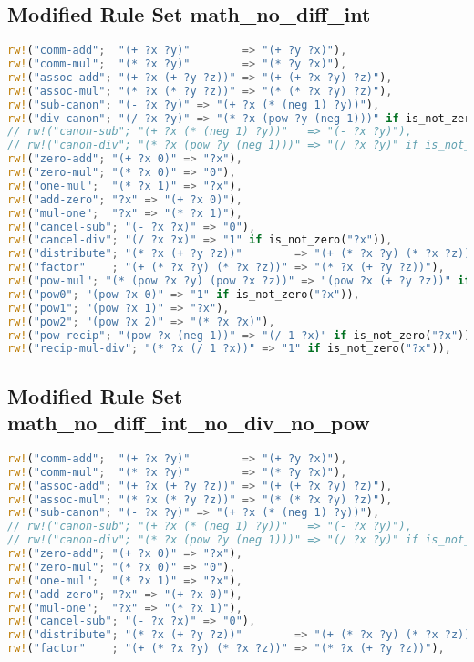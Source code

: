 \newpage
\subsection{Modified Rule Set math\_no\_diff\_int}
\label{app:no_diff_int}
\begin{lstlisting}[language=Rust, caption={Rule set \ref{app:base_rules} without differentiation and integration rules and $-1$ replaced with $\text{neg}(1)$.}, label={lst:no_diff_int}]
rw!("comm-add";  "(+ ?x ?y)"        => "(+ ?y ?x)"),
rw!("comm-mul";  "(* ?x ?y)"        => "(* ?y ?x)"),
rw!("assoc-add"; "(+ ?x (+ ?y ?z))" => "(+ (+ ?x ?y) ?z)"),
rw!("assoc-mul"; "(* ?x (* ?y ?z))" => "(* (* ?x ?y) ?z)"),	
rw!("sub-canon"; "(- ?x ?y)" => "(+ ?x (* (neg 1) ?y))"),
rw!("div-canon"; "(/ ?x ?y)" => "(* ?x (pow ?y (neg 1)))" if is_not_zero("?y")),
// rw!("canon-sub"; "(+ ?x (* (neg 1) ?y))"   => "(- ?x ?y)"),
// rw!("canon-div"; "(* ?x (pow ?y (neg 1)))" => "(/ ?x ?y)" if is_not_zero("?y")),	
rw!("zero-add"; "(+ ?x 0)" => "?x"),
rw!("zero-mul"; "(* ?x 0)" => "0"),
rw!("one-mul";  "(* ?x 1)" => "?x"),	
rw!("add-zero"; "?x" => "(+ ?x 0)"),
rw!("mul-one";  "?x" => "(* ?x 1)"),	
rw!("cancel-sub"; "(- ?x ?x)" => "0"),
rw!("cancel-div"; "(/ ?x ?x)" => "1" if is_not_zero("?x")),	
rw!("distribute"; "(* ?x (+ ?y ?z))"        => "(+ (* ?x ?y) (* ?x ?z))"),
rw!("factor"    ; "(+ (* ?x ?y) (* ?x ?z))" => "(* ?x (+ ?y ?z))"),
rw!("pow-mul"; "(* (pow ?x ?y) (pow ?x ?z))" => "(pow ?x (+ ?y ?z))" if is_not_zero("?x")),
rw!("pow0"; "(pow ?x 0)" => "1" if is_not_zero("?x")),
rw!("pow1"; "(pow ?x 1)" => "?x"),
rw!("pow2"; "(pow ?x 2)" => "(* ?x ?x)"),
rw!("pow-recip"; "(pow ?x (neg 1))" => "(/ 1 ?x)" if is_not_zero("?x")),
rw!("recip-mul-div"; "(* ?x (/ 1 ?x))" => "1" if is_not_zero("?x")),
\end{lstlisting}

\newpage
\subsection{Modified Rule Set math\_no\_diff\_int\_no\_div\_no\_pow}
\label{app:no_diff_int_no_pow}
\begin{lstlisting}[language=Rust, caption={Rule set \ref{app:no_diff_int} without rules containing division and power operators.}, label={lst:no_diff_int_no_div_no_pow}]
rw!("comm-add";  "(+ ?x ?y)"        => "(+ ?y ?x)"),
rw!("comm-mul";  "(* ?x ?y)"        => "(* ?y ?x)"),
rw!("assoc-add"; "(+ ?x (+ ?y ?z))" => "(+ (+ ?x ?y) ?z)"),
rw!("assoc-mul"; "(* ?x (* ?y ?z))" => "(* (* ?x ?y) ?z)"),
rw!("sub-canon"; "(- ?x ?y)" => "(+ ?x (* (neg 1) ?y))"),
// rw!("canon-sub"; "(+ ?x (* (neg 1) ?y))"   => "(- ?x ?y)"),
// rw!("canon-div"; "(* ?x (pow ?y (neg 1)))" => "(/ ?x ?y)" if is_not_zero("?y")),
rw!("zero-add"; "(+ ?x 0)" => "?x"),
rw!("zero-mul"; "(* ?x 0)" => "0"),
rw!("one-mul";  "(* ?x 1)" => "?x"),
rw!("add-zero"; "?x" => "(+ ?x 0)"),
rw!("mul-one";  "?x" => "(* ?x 1)"),
rw!("cancel-sub"; "(- ?x ?x)" => "0"),
rw!("distribute"; "(* ?x (+ ?y ?z))"        => "(+ (* ?x ?y) (* ?x ?z))"),
rw!("factor"    ; "(+ (* ?x ?y) (* ?x ?z))" => "(* ?x (+ ?y ?z))"),
\end{lstlisting}

